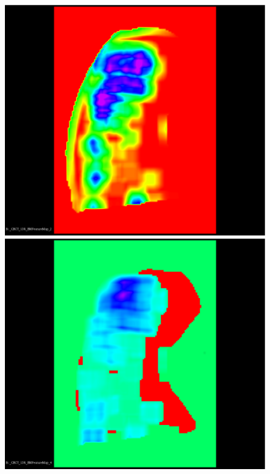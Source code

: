 \documentclass{InsightArticle}
\begin{document}
\begin{figure}[H]
  \begin{center}
    \includegraphics[scale=0.115]{figures/TbN.eps}
    \includegraphics[scale=0.115]{figures/TbSp.eps}

\end{center}
\end{figure}
\end{document}
